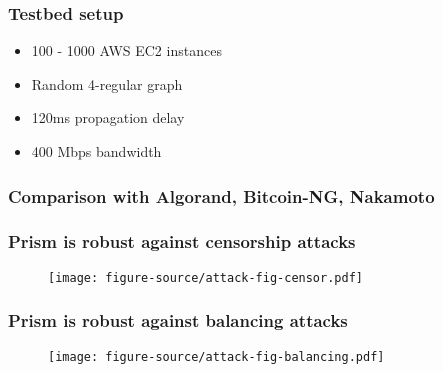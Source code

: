 \documentclass[svgnames]{beamer}
\begin{document}
\begin{frame}
    \frametitle{Testbed setup}
    \begin{itemize}
        \item 100 - 1000 AWS EC2 instances
        \item Random 4-regular graph
        \item 120ms propagation delay
        \item 400 Mbps bandwidth
    \end{itemize}
\end{frame}

\begin{frame}
    \frametitle{Comparison with Algorand, Bitcoin-NG, Nakamoto}
\end{frame}

\begin{frame}
    \frametitle{Prism is robust against censorship attacks}
    \begin{figure}
        \centering
        \texttt{[image: figure-source/attack-fig-censor.pdf]}
    \end{figure}
\end{frame}

\begin{frame}
    \frametitle{Prism is robust against balancing attacks}
    \begin{figure}
        \centering
        \texttt{[image: figure-source/attack-fig-balancing.pdf]}
    \end{figure}
\end{frame}
\end{document}
